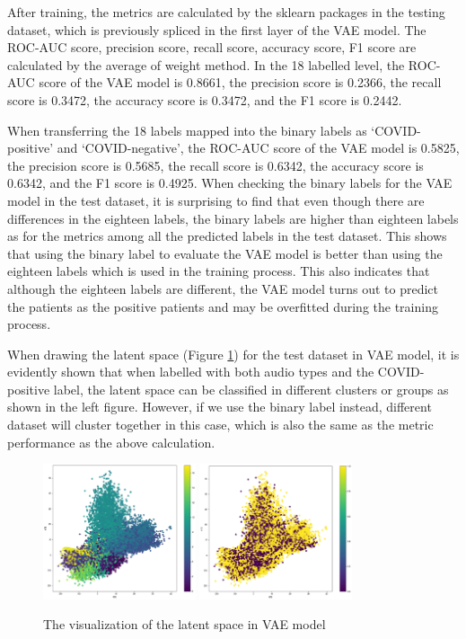 \documentclass[11pt]{article}
\begin{document}
After training, the metrics are calculated by the sklearn packages in the testing dataset, which is previously spliced in the first layer of the VAE model. The ROC-AUC score, precision score, recall score, accuracy score, F1 score are calculated by the average of weight method. In the 18 labelled level, the ROC-AUC score of the VAE model is 0.8661, the precision score is 0.2366, the recall score is 0.3472, the accuracy score is 0.3472, and the F1 score is 0.2442.
 
When transferring the 18 labels mapped into the binary labels as ‘COVID-positive’ and ‘COVID-negative’, the ROC-AUC score of the VAE model is 0.5825, the precision score is 0.5685, the recall score is 0.6342, the accuracy score is 0.6342, and the F1 score is 0.4925. When checking the binary labels for the VAE model in the test dataset, it is surprising to find that even though there are differences in the eighteen labels, the binary labels are higher than eighteen labels as for the metrics among all the predicted labels in the test dataset. This shows that using the binary label to evaluate the VAE model is better than using the eighteen labels which is used in the training process. This also indicates that although the eighteen labels are different, the VAE model turns out to predict the patients as the positive patients and may be overfitted during the training process.

When drawing the latent space (Figure \ref{fig:latent_space}) for the test dataset in VAE model, it is evidently shown that when labelled with both audio types and the COVID-positive label, the latent space can be classified in different clusters or groups as shown in the left figure. However, if we use the binary label instead, different dataset will cluster together in this case, which is also the same as the metric performance as the above calculation.

\begin{figure}[htbp]{}
	\centering
    \includegraphics[width=0.4\textwidth]{./imgs/latentSpace1.png} %
    \includegraphics[width=0.4\textwidth]{./imgs/latentSpace2.png} %
    \caption{The visualization of the latent space in VAE model}
    \label{fig:latent_space}
\end{figure}
\end{document}
